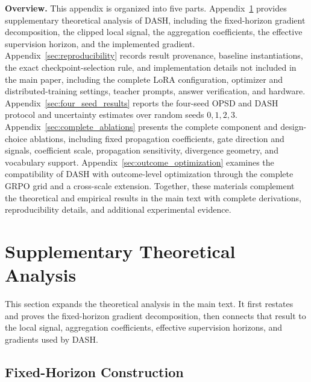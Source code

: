 \documentclass[letterpaper]{article} %
\begin{document}
\noindent\textbf{Overview.}
This appendix is organized into five parts.
Appendix~\ref{app:theory} provides supplementary theoretical analysis of DASH,
including the fixed-horizon gradient decomposition, the clipped local
signal, the aggregation coefficients, the effective supervision
horizon, and the implemented gradient.
Appendix~\ref{sec:reproducibility} records result provenance, baseline
instantiations, the exact checkpoint-selection rule, and implementation
details not included in the main paper, including the complete LoRA
configuration, optimizer and distributed-training settings, teacher
prompts, answer verification, and hardware.
Appendix~\ref{sec:four_seed_results} reports the four-seed OPSD and DASH
protocol and uncertainty estimates over random seeds \(0,1,2,3\).
Appendix~\ref{sec:complete_ablations} presents the complete component and design-choice ablations,
including fixed propagation coefficients, gate direction and signals,
coefficient scale, propagation sensitivity, divergence geometry, and
vocabulary support.
Appendix~\ref{sec:outcome_optimization} examines the compatibility of DASH with outcome-level
optimization through the complete GRPO grid and a cross-scale
extension. Together, these materials complement the theoretical and
empirical results in the main text with complete derivations,
reproducibility details, and additional experimental evidence.

\section{Supplementary Theoretical Analysis}
\label{app:theory}

This section expands the theoretical analysis in the main text. It
first restates and proves the fixed-horizon gradient decomposition, then
connects that result to the local signal, aggregation coefficients,
effective supervision horizons, and gradients used by DASH.

\subsection{Fixed-Horizon Construction}
\label{app:fixed_horizon}
\end{document}
